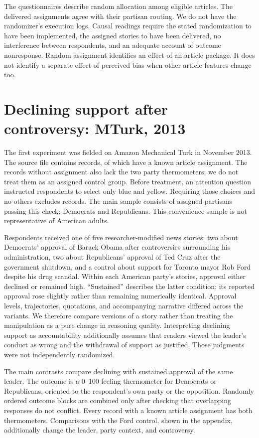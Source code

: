 \documentclass[11pt]{article}
\begin{document}
The questionnaires describe random allocation among eligible articles. The delivered assignments agree with their partisan routing. We do not have the randomizer's execution logs. Causal readings require the stated randomization to have been implemented, the assigned stories to have been delivered, no interference between respondents, and an adequate account of outcome nonresponse. Random assignment identifies an effect of an article package. It does not identify a separate effect of perceived bias when other article features change too.

\section{Declining support after controversy: MTurk, 2013}
The first experiment was fielded on Amazon Mechanical Turk in November 2013. The source file contains \MtRaw{} records, of which \MtAssigned{} have a known article assignment. The \MtUnassigned{} records without assignment also lack the two party thermometers; we do not treat them as an assigned control group. Before treatment, an attention question instructed respondents to select only blue and yellow. Requiring those choices and no others excludes \MtAttentionDrop{} records. The main sample consists of \MtN{} assigned partisans passing this check: \MtDemN{} Democrats and \MtRepN{} Republicans. This convenience sample is not representative of American adults.

Respondents received one of five researcher-modified news stories: two about Democrats' approval of Barack Obama after controversies surrounding his administration, two about Republicans' approval of Ted Cruz after the government shutdown, and a control about support for Toronto mayor Rob Ford despite his drug scandal. Within each American party's stories, approval either declined or remained high. ``Sustained'' describes the latter condition; its reported approval rose slightly rather than remaining numerically identical. Approval levels, trajectories, quotations, and accompanying narrative differed across the variants. We therefore compare versions of a story rather than treating the manipulation as a pure change in reasoning quality. Interpreting declining support as accountability additionally assumes that readers viewed the leader's conduct as wrong and the withdrawal of support as justified. Those judgments were not independently randomized.

The main contrasts compare declining with sustained approval of the same leader. The outcome is a 0--100 feeling thermometer for Democrats or Republicans, oriented to the respondent's own party or the opposition. Randomly ordered outcome blocks are combined only after checking that overlapping responses do not conflict. Every record with a known article assignment has both thermometers. Comparisons with the Ford control, shown in the appendix, additionally change the leader, party context, and controversy.
\end{document}
